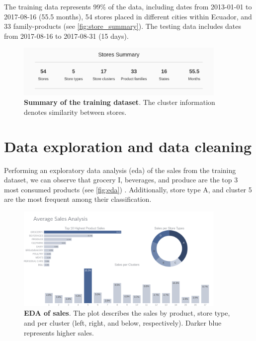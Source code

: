 The training data represents 99\% of the data, including dates from 2013-01-01 to 2017-08-16 (55.5 months), 54 stores placed in different cities within Ecuador, and 33 family-products (see \autoref{fig:store_summary}). The testing data includes dates from 2017-08-16 to 2017-08-31 (15 days).

\begin{figure}[!htb]
  \centering
  \includegraphics[width=0.9\textwidth]{plots/data_description/stores_summary.png}
  \caption[Summary of the training dataset]{\textbf{Summary of the training dataset}. The cluster information denotes similarity between stores.}
  \label{fig:store_summary}
\end{figure}

\section[Data exploration and data cleaning]{Data exploration and data cleaning}
\label{sec:eda}

Performing an exploratory data analysis (eda) of the sales from the training dataset, we can observe that grocery I, beverages, and produce are the top 3 most consumed products (see \autoref{fig:eda}) . Additionally, store type A, and cluster 5 are the most frequent among their classification.

\begin{figure}[!htb]
  \centering
  \includegraphics[width=0.9\textwidth]{plots/eda/sale_analysis.png}
  \caption[EDA of sales]{\textbf{EDA of sales}. The plot describes the sales by product, store type, and per cluster (left, right, and below, respectively). Darker blue represents higher sales. }
  \label{fig:eda}
\end{figure}

